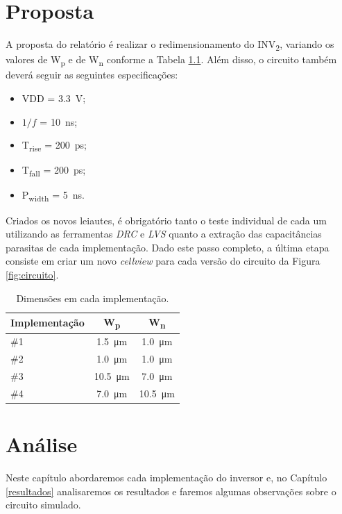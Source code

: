 \documentclass{iiufrgs}
\begin{document}
\chapter{Proposta}\label{proposta}
A proposta do relatório é realizar o redimensionamento do INV\textsubscript{2}, variando os valores de W\textsubscript{p} e de W\textsubscript{n} conforme a Tabela \ref{tab:imp}.
Além disso, o circuito também deverá seguir as seguintes especificações:

\begin{itemize}[noitemsep]
    \setlength{\itemindent}{1em}
    \item VDD = \SI{3.3}{\V};
    \item $1/f$ = \SI{10}{\ns};
    \item T\textsubscript{rise} = \SI{200}{\ps};
    \item T\textsubscript{fall} = \SI{200}{\ps};
    \item P\textsubscript{width} = \SI{5}{\ns}.
\end{itemize}

Criados os novos leiautes, é obrigatório tanto o teste individual de cada um utilizando as ferramentas \textit{DRC} e \textit{LVS} quanto a extração das capacitâncias parasitas de cada implementação.
Dado este passo completo, a última etapa consiste em criar um novo \textit{cellview} para cada versão do circuito da Figura \ref{fig:circuito}.

\begin{table}[ht]
    \centering
    \caption{Dimensões em cada implementação.}
    \label{tab:imp}
    \begin{tabular}{l c c}
        \hline
        Implementação
        & W\textsubscript{p}
        & W\textsubscript{n} \\ \hline
        \#1 & \SI{1.5}{\um}     & \SI{1.0}{\um}     \\ 
        \#2 & \SI{1.0}{\um}     & \SI{1.0}{\um}     \\ 
        \#3 & \SI{10.5}{\um}    & \SI{7.0}{\um}     \\ 
        \#4 & \SI{7.0}{\um}     & \SI{10.5}{\um}    \\ \hline
    \end{tabular}
\end{table}

\chapter{Análise}\label{analise}
Neste capítulo abordaremos cada implementação do inversor e, no Capítulo \ref{resultados} analisaremos os resultados e faremos algumas observações sobre o circuito simulado.
\end{document}
